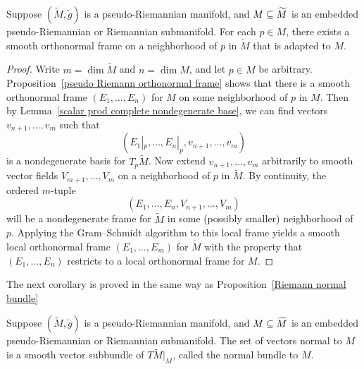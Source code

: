 \begin{proposition}
Suppose $(\widetilde{M},\widetilde{g})$ is a pseudo-Riemannian manifold, 
and $M\subseteq\widetilde{M}$ is an embedded pseudo-Riemannian or Riemannian 
submanifold. For each $p\in M$, there exists a smooth orthonormal frame on 
a neighborhood of $p$ in $\widetilde{M}$ that is adapted to $M$.
\end{proposition}
\begin{proof}
Write $m=\dim\widetilde{M}$ and $n=\dim M$, and let $p\in M$ be arbitrary. 
Proposition~\ref{pseudo Riemann orthonormal frame} shows that there is a 
smooth orthonormal frame $(E_1,\dots,E_n)$ for $M$ on some neighborhood of 
$p$ in $M$. Then by Lemma~\ref{scalar prod complete nondegenerate base}, we can find vectors $v_{n+1},\dots,v_m$ 
such that 
\[(E_1|_p,\dots,E_n|_p,v_{n+1},\dots,v_m)\]
is a nondegenerate basis for $T_p\widetilde{M}$. Now extend $v_{n+1},\dots,v_m$ arbitrarily to 
smooth vector fields $V_{m+1},\dots,V_m$ on a neighborhood of $p$ in $\widetilde{M}$. 
By continuity, the ordered $m$-tuple 
\[(E_1,\dots,E_n,V_{n+1},\dots,V_m)\] 
will be a nondegenerate frame for $\widetilde{M}$ in some (possibly smaller) 
neighborhood of $p$. Applying the Gram–Schmidt algorithm to this local 
frame yields a smooth local orthonormal frame $(E_1,\dots,E_m)$ for $\widetilde{M}$ 
with the property that $(E_1,\dots,E_n)$ restricts to a local orthonormal 
frame for $M$.
\end{proof}
The next corollary is proved in the same way as Proposition~\ref{Riemann normal bundle}
\begin{corollary}
Suppose $(\widetilde{M},\widetilde{g})$ is a pseudo-Riemannian manifold, 
and $M\subseteq\widetilde{M}$ is an embedded pseudo-Riemannian or Riemannian 
submanifold. The set of vectors normal to $M$ is a smooth vector subbundle 
of $T\widetilde{M}|_M$, called the normal bundle to $M$.
\end{corollary}
